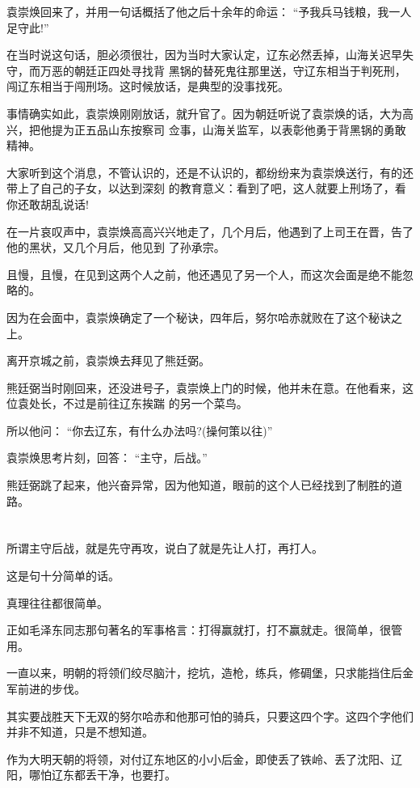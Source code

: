 \documentclass[11pt,a4paper,onecolumn]{article}
\begin{document}
袁崇焕回来了，并用一句话概括了他之后十余年的命运： ``予我兵马钱粮，我一人足守此!''

在当时说这句话，胆必须很壮，因为当时大家认定，辽东必然丢掉，山海关迟早失守，而万恶的朝廷正四处寻找背
黑锅的替死鬼往那里送，守辽东相当于判死刑，闯辽东相当于闯刑场。这时候放话，是典型的没事找死。

事情确实如此，袁崇焕刚刚放话，就升官了。因为朝廷听说了袁崇焕的话，大为高兴，把他提为正五品山东按察司
佥事，山海关监军，以表彰他勇于背黑锅的勇敢精神。

大家听到这个消息，不管认识的，还是不认识的，都纷纷来为袁崇焕送行，有的还带上了自己的子女，以达到深刻
的教育意义：看到了吧，这人就要上刑场了，看你还敢胡乱说话!

在一片哀叹声中，袁崇焕高高兴兴地走了，几个月后，他遇到了上司王在晋，告了他的黑状，又几个月后，他见到
了孙承宗。

且慢，且慢，在见到这两个人之前，他还遇见了另一个人，而这次会面是绝不能忽略的。

因为在会面中，袁崇焕确定了一个秘诀，四年后，努尔哈赤就败在了这个秘诀之上。

离开京城之前，袁崇焕去拜见了熊廷弼。

熊廷弼当时刚回来，还没进号子，袁崇焕上门的时候，他并未在意。在他看来，这位袁处长，不过是前往辽东挨踹
的另一个菜鸟。

所以他问： ``你去辽东，有什么办法吗?(操何策以往)''

袁崇焕思考片刻，回答： ``主守，后战。''

熊廷弼跳了起来，他兴奋异常，因为他知道，眼前的这个人已经找到了制胜的道路。

\section[\thesection]{}

所谓主守后战，就是先守再攻，说白了就是先让人打，再打人。

这是句十分简单的话。

真理往往都很简单。

正如毛泽东同志那句著名的军事格言：打得赢就打，打不赢就走。很简单，很管用。

一直以来，明朝的将领们绞尽脑汁，挖坑，造枪，练兵，修碉堡，只求能挡住后金军前进的步伐。

其实要战胜天下无双的努尔哈赤和他那可怕的骑兵，只要这四个字。这四个字他们并非不知道，只是不想知道。

作为大明天朝的将领，对付辽东地区的小小后金，即使丢了铁岭、丢了沈阳、辽阳，哪怕辽东都丢干净，也要打。
\end{document}
